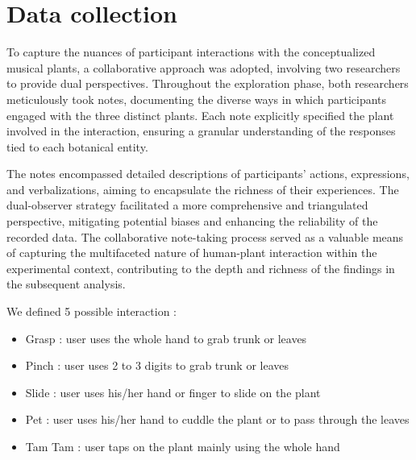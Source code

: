 \section{Data collection}
To capture the nuances of participant interactions with the conceptualized musical plants, a collaborative approach was adopted, involving two researchers to provide dual perspectives. Throughout the exploration phase, both researchers meticulously took notes, documenting the diverse ways in which participants engaged with the three distinct plants. Each note explicitly specified the plant involved in the interaction, ensuring a granular understanding of the responses tied to each botanical entity.

The notes encompassed detailed descriptions of participants' actions, expressions, and verbalizations, aiming to encapsulate the richness of their experiences. The dual-observer strategy facilitated a more comprehensive and triangulated perspective, mitigating potential biases and enhancing the reliability of the recorded data. The collaborative note-taking process served as a valuable means of capturing the multifaceted nature of human-plant interaction within the experimental context, contributing to the depth and richness of the findings in the subsequent analysis.

We defined 5 possible interaction :

\begin{itemize}
    \item Grasp : user uses the whole hand to grab trunk or leaves
    \item Pinch : user uses 2 to 3 digits to grab trunk or leaves
    \item Slide : user uses his/her hand or finger to slide on the plant
    \item Pet : user uses his/her hand to cuddle the plant or to pass through the leaves
    \item Tam Tam : user taps on the plant mainly using the whole hand
\end{itemize}

